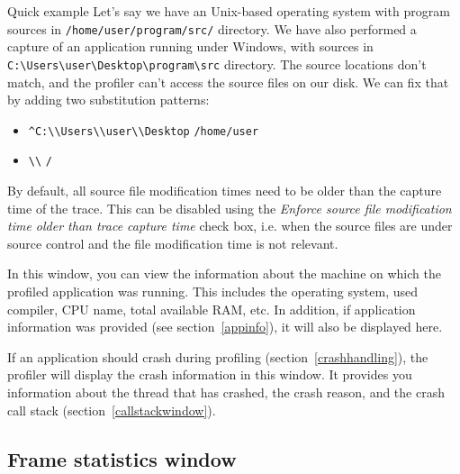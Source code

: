 \documentclass[hidelinks,titlepage,a4paper,twoside]{article}
\begin{document}
\begin{bclogo}[
noborder=true,
couleur=black!5,
logo=\bclampe
]{Quick example}
Let's say we have an Unix-based operating system with program sources in \texttt{/home/user/program/src/} directory. We have also performed a capture of an application running under Windows, with sources in \texttt{C:\textbackslash{}Users\textbackslash{}user\textbackslash{}Desktop\textbackslash{}program\textbackslash{}src} directory. The source locations don't match, and the profiler can't access the source files on our disk. We can fix that by adding two substitution patterns:

\begin{itemize}
\item \texttt{\^{}C:\textbackslash{}\textbackslash{}Users\textbackslash{}\textbackslash{}user\textbackslash{}\textbackslash{}Desktop} \hspace{1em}\textrightarrow\hspace{1em} \texttt{/home/user}
\item \texttt{\textbackslash{}\textbackslash{}} \hspace{1em}\textrightarrow\hspace{1em} \texttt{/}
\end{itemize}
\end{bclogo}

By default, all source file modification times need to be older than the capture time of the trace. This can be disabled using the \emph{Enforce source file modification time older than trace capture time} check box, i.e. when the source files are under source control and the file modification time is not relevant.

In this window, you can view the information about the machine on which the profiled application was running. This includes the operating system, used compiler, CPU name, total available RAM, etc. In addition, if application information was provided (see section~\ref{appinfo}), it will also be displayed here.

If an application should crash during profiling (section~\ref{crashhandling}), the profiler will display the crash information in this window. It provides you information about the thread that has crashed, the crash reason, and the crash call stack (section~\ref{callstackwindow}).

\subsection{Frame statistics window}
\label{framestatistics}
\end{document}
